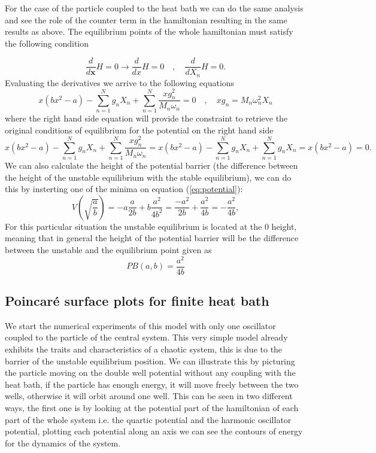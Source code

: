 For the case of the particle coupled to the heat bath we can do the same analysis and see the role of the counter term in the hamiltonian resulting in the same results as above. The equilibrium points of the whole hamiltonian must satisfy the following condition

\begin{equation}
\frac{d}{d\textbf{x}}H=0\rightarrow \frac{d}{dx}H =0 \quad , \quad \frac{d}{dX_n}H  = 0.
\end{equation}
Evaluating the derivatives we arrive to the following equations
\begin{equation}
x(bx^2-a)-\sum_{n=1}^N g_n X_n +\sum_{n=1}^N \frac{xg_n^2}{M_n\omega_n}=0 \quad , \quad xg_n=M_n\omega_n^2 X_n 
\end{equation}
where the right hand side equation will provide the constraint to retrieve the original conditions of equilibrium for the potential on the right hand side
\begin{equation}
x(bx^2-a)-\sum_{n=1}^N g_n X_n +\sum_{n=1}^N \frac{xg_n^2}{M_n\omega_n}= x(bx^2-a)-\sum_{n=1}^N g_n X_n +\sum_{n=1}^N g_n X_n=x(bx^2-a)=0.
\end{equation}
We can also calculate the height of the potential barrier (the difference between the height of the unstable equilibrium with the stable equilibrium), we can do this by insterting one of the minima on equation (\ref{eq:potential}):
\begin{equation}
V(\sqrt{\frac{a}{b}})=-a\frac{a}{2b}+b\frac{a^2}{4b^2}=\frac{-a^2}{2b}+\frac{a^2}{4b}=-\frac{a^2}{4b},
\end{equation}
For this particular situation the unstable equilibrium is located at the $0$ height, meaning that in general the height of the potential barrier will be the difference between the unstable and the equilibrium point given as
\begin{equation}
PB(a,b)=\frac{a^2}{4b}
\label{eq:PB_eq}
\end{equation}





\subsection{Poincaré surface plots for finite heat bath}
We start the numerical experiments of this model with only one oscillator coupled to the particle of the central system. This very simple model already exhibits the traits and characteristics of a chaotic system, this is due to the barrier of the unstable equilibrium position. We can illustrate this by picturing the particle moving on the double well potential without any coupling with the heat bath, if the particle has enough energy, it will move freely between the two wells, otherwise it will orbit around one well. This can be seen in two different ways, the first one is by looking at the potential part of the hamiltonian of each part of the whole system i.e. the quartic potential and the harmonic oscillator potential, plotting each potential along an axis we can see the contours of energy for the dynamics of the system.

